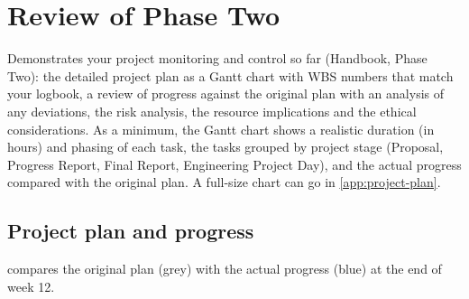 \section{Review of Phase Two}
\label{sec:review}

\begin{guidance}
Demonstrates your project monitoring and control so far (Handbook, Phase
Two): the detailed project plan as a Gantt chart with WBS numbers that match
your logbook, a review of progress against the original plan with an
analysis of any deviations, the risk analysis, the resource implications and
the ethical considerations. As a minimum, the Gantt chart shows a
realistic duration (in hours) and phasing of each task, the tasks grouped by
project stage (Proposal, Progress Report, Final Report, Engineering Project
Day), and the actual progress compared with the original plan. A full-size
chart can go in \cref{app:project-plan}.
\end{guidance}

\subsection{Project plan and progress}
\label{sec:plan}

 compares the original plan (grey) with the actual progress
(blue) at the end of week 12.

